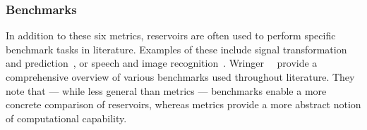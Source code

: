 \subsubsection{Benchmarks} %
In addition to these six metrics, reservoirs are often used to perform specific benchmark tasks in literature.
Examples of these include signal transformation and prediction~\cite{NeuromorphicFewShot,jaeger2001echo,JaegerHaasWireless,RC_MemristorTemporal,Sunspots_Shougat,gartside2022reconfigurable,appeltant2011information,Vidamour2023}, or speech and image recognition~\cite{farronato2022reservoir,grollier2020neuromorphic,DynamicEmergence_NanomagneticSystem,Vidamour2023}. %
Wringer~\etal~\cite{RCbenchmarksReview1} provide a comprehensive overview of various benchmarks used throughout literature.
They note that --- while less general than metrics --- benchmarks enable a more concrete comparison of reservoirs, whereas metrics provide a more abstract notion of computational capability.

